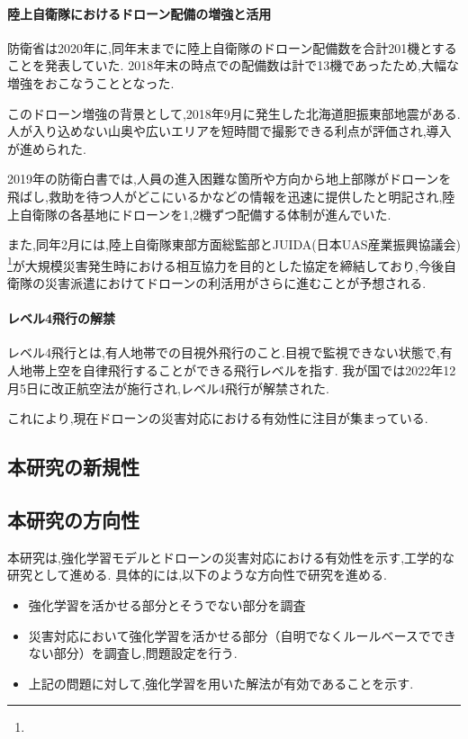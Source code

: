 \documentclass{article}[jsarticle]
\begin{document}
\paragraph{陸上自衛隊におけるドローン配備の増強と活用}
防衛省は2020年に,同年末までに陸上自衛隊のドローン配備数を合計201機とすることを発表していた.
2018年末の時点での配備数は計で13機であったため,大幅な増強をおこなうこととなった.\par
このドローン増強の背景として,2018年9月に発生した北海道胆振東部地震がある.人が入り込めない山奥や広いエリアを短時間で撮影できる利点が評価され,導入が進められた.\par
2019年の防衛白書では,人員の進入困難な箇所や方向から地上部隊がドローンを飛ばし,救助を待つ人がどこにいるかなどの情報を迅速に提供したと明記され,陸上自衛隊の各基地にドローンを1,2機ずつ配備する体制が進んでいた.\par
また,同年2月には,陸上自衛隊東部方面総監部とJUIDA(日本UAS産業振興協議会)
\footnote{}が大規模災害発生時における相互協力を目的とした協定を締結しており,今後自衛隊の災害派遣におけてドローンの利活用がさらに進むことが予想される.
\paragraph{レベル4飛行の解禁} \par
レベル4飛行とは,有人地帯での目視外飛行のこと.目視で監視できない状態で,有人地帯上空を自律飛行することができる飛行レベルを指す.
我が国では2022年12月5日に改正航空法が施行され,レベル4飛行が解禁された.\par 
これにより,現在ドローンの災害対応における有効性に注目が集まっている.

\subsection{本研究の新規性}

\subsection{本研究の方向性}
本研究は,強化学習モデルとドローンの災害対応における有効性を示す,工学的な研究として進める.
具体的には,以下のような方向性で研究を進める.
\begin{itemize}
    \item 強化学習を活かせる部分とそうでない部分を調査
    \item 災害対応において強化学習を活かせる部分（自明でなくルールベースでできない部分）を調査し,問題設定を行う.
    \item 上記の問題に対して,強化学習を用いた解法が有効であることを示す.
\end{itemize}
\end{document}

